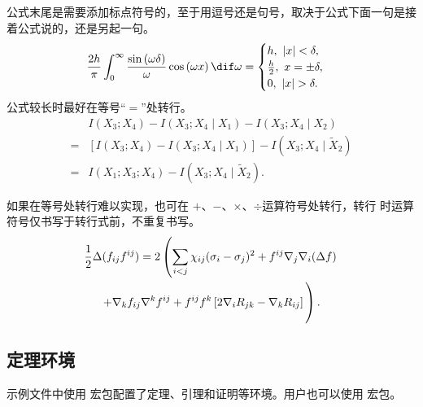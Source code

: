 公式末尾是需要添加标点符号的，至于用逗号还是句号，取决于公式下面一句是接着公式说的，还是另起一句。
\begin{equation}
		\frac{2h}{\pi}\int_{0}^{\infty}\frac{\sin\left( \omega\delta \right)}{\omega}
		\cos\left( \omega x \right) \dif\omega = 
		\begin{cases}
				h, \ \left| x \right| < \delta, \\
				\frac{h}{2}, \ x = \pm \delta, \\
				0, \ \left| x \right| > \delta.
		\end{cases}
\end{equation}
公式较长时最好在等号“$=$”处转行。
\begin{align}
    & I (X_3; X_4) - I (X_3; X_4 \mid X_1) - I (X_3; X_4 \mid X_2) \nonumber \\
  = & [I (X_3; X_4) - I (X_3; X_4 \mid X_1)] - I (X_3; X_4 \mid \tilde{X}_2) \\
  = & I (X_1; X_3; X_4) - I (X_3; X_4 \mid \tilde{X}_2).
\end{align}

如果在等号处转行难以实现，也可在 $+$、$-$、$\times$、$\div$运算符号处转行，转行
时运算符号仅书写于转行式前，不重复书写。
\begin{multline}
  \frac{1}{2} \Delta (f_{ij} f^{ij}) =
    2 \left(\sum_{i<j} \chi_{ij}(\sigma_{i} - \sigma_{j})^{2}
    + f^{ij} \nabla_{j} \nabla_{i} (\Delta f) \right. \\
  \left. + \nabla_{k} f_{ij} \nabla^{k} f^{ij} +
    f^{ij} f^{k} \left[2\nabla_{i}R_{jk}
    - \nabla_{k} R_{ij} \right] \vphantom{\sum_{i<j}} \right).
\end{multline}

\subsection{定理环境}

示例文件中使用  宏包配置了定理、引理和证明等环境。用户也可以使用
 宏包。

